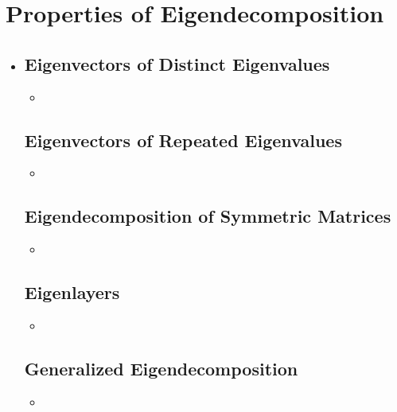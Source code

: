 \section{Properties of Eigendecomposition}\label{Properties of Eigendecomposition}
\begin{itemize}
  \item []
  
  \subsection{Eigenvectors of Distinct Eigenvalues}\label{Eigenvectors of Distinct Eigenvalues}
  \begin{itemize}
    \item 
  \end{itemize}
  
  \subsection{Eigenvectors of Repeated Eigenvalues}\label{Eigenvectors of Repeated Eigenvalues}
  \begin{itemize}
    \item 
  \end{itemize}

  \subsection{Eigendecomposition of Symmetric Matrices}\label{Eigendecomposition of Symmetric Matrices}
  \begin{itemize}
    \item 
  \end{itemize}
  
  \subsection{Eigenlayers}\label{Eigenlayers}
  \begin{itemize}
    \item 
  \end{itemize}
  
  \subsection{Generalized Eigendecomposition}\label{Generalized Eigendecomposition}
  \begin{itemize}
    \item 
  \end{itemize}
  
\end{itemize}




